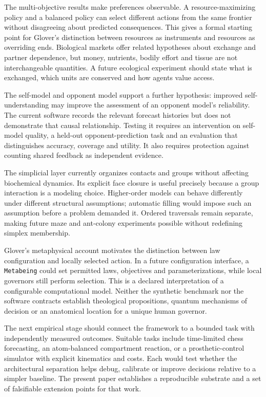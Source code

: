\documentclass[10pt,a4paper]{article}
\begin{document}
The multi-objective results make preferences observable. A resource-maximizing policy and a balanced policy can select different actions from the same frontier without disagreeing about predicted consequences. This gives a formal starting point for Glover's distinction between resources as instruments and resources as overriding ends. Biological markets offer related hypotheses about exchange and partner dependence\cite{werner}, but money, nutrients, bodily effort and tissue are not interchangeable quantities. A future ecological experiment should state what is exchanged, which units are conserved and how agents value access.

The self-model and opponent model support a further hypothesis: improved self-understanding may improve the assessment of an opponent model's reliability. The current software records the relevant forecast histories but does not demonstrate that causal relationship. Testing it requires an intervention on self-model quality, a held-out opponent-prediction task and an evaluation that distinguishes accuracy, coverage and utility. It also requires protection against counting shared feedback as independent evidence.

The simplicial layer currently organizes contacts and groups without affecting biochemical dynamics. Its explicit face closure is useful precisely because a group interaction is a modeling choice. Higher-order models can behave differently under different structural assumptions\cite{zhang}; automatic filling would impose such an assumption before a problem demanded it. Ordered traversals remain separate, making future maze and ant-colony experiments possible without redefining simplex membership.

Glover's metaphysical account motivates the distinction between law configuration and locally selected action. In a future configuration interface, a \texttt{Metabeing} could set permitted laws, objectives and parameterizations, while local governors still perform selection. This is a declared interpretation of a configurable computational model. Neither the synthetic benchmark nor the software contracts establish theological propositions, quantum mechanisms of decision or an anatomical location for a unique human governor.

The next empirical stage should connect the framework to a bounded task with independently measured outcomes. Suitable tasks include time-limited chess forecasting, an atom-balanced compartment reaction, or a prosthetic-control simulator with explicit kinematics and costs. Each would test whether the architectural separation helps debug, calibrate or improve decisions relative to a simpler baseline. The present paper establishes a reproducible substrate and a set of falsifiable extension points for that work.
\end{document}
